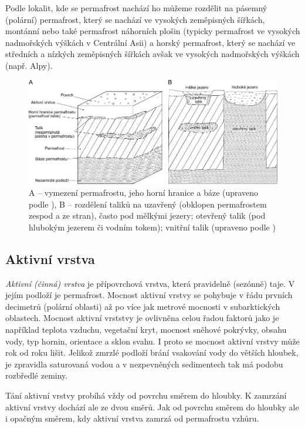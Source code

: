 Podle lokalit, kde se permafrost nachází ho můžeme rozdělit na pásemný (polární) permafrost, který se nachází ve vysokých zeměpisných šířkách, montánní nebo také permafrost náhorních plošin (typicky permafrost ve vysokých nadmořských výškách v Centrální Asii) a horský permafrost, který se nachází ve středních a nízkých zeměpisných šířkách avšak ve vysokých nadmořských výškách (např. Alpy).


\begin{figure}[h]
	\centering
	\includegraphics[width=1\linewidth]{obrazky/periglac/talik}
	\caption{A -- vymezení permafrostu, jeho horní hranice a báze (upraveno podle \textcite{jrPermafrostRelatedEngineering1969}), B -- rozdělení taliků na uzavřený (obklopen permafrostem zespod a ze stran), často pod mělkými jezery; otevřený talik (pod hlubokým jezerem či vodním tokem); vnitřní talik (upraveno podle \textcite{demekObecnaGeomorfologie1987})}
	\label{fig:talik}
\end{figure}

\subsection{Aktivní vrstva}
\emph{Aktivní (činná) vrstva} je přípovrchová vrstva, která pravidelně (sezónně) taje. V jejím podloží je permafrost. Mocnost aktivní vrstvy se pohybuje v řádu prvních decimetrů (polární oblasti) až po více jak metrové mocnosti v subarktických oblastech. Mocnost aktivní vrststvy je ovlivněna celou řadou faktorů jako je například teplota vzduchu, vegetační kryt, mocnost sněhové pokrývky, obsahu vody, typ hornin, orientace a sklon svahu. I proto se mocnost aktivní vrstvy může rok od roku lišit. Jelikož zmrzlé podloží brání vsakování vody do větších hloubek, je zpravidla saturovaná vodou a v nezpevněných sedimentech tak má podobu rozbředlé zeminy. 

Tání aktivní vrstvy probíhá vždy od povrchu směrem do hloubky. K zamrzání aktivní vrstvy dochází ale ze dvou směrů. Jak od povrchu směrem do hloubky ale i opačným směrem, kdy aktivní vrstva zamrzá od permafrostu vzhůru. 

